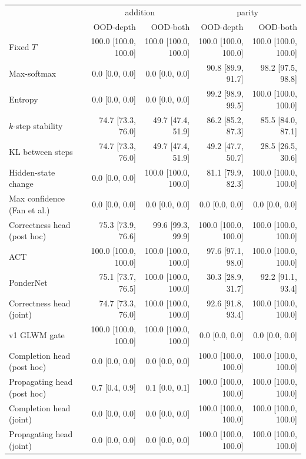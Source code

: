 \begin{tabular}{lrrrr}
\toprule
 & \multicolumn{2}{c}{addition} & \multicolumn{2}{c}{parity} \\
 & OOD-depth & OOD-both & OOD-depth & OOD-both \\
\midrule
Fixed $T$ & 100.0 \tiny{[100.0, 100.0]} & 100.0 \tiny{[100.0, 100.0]} & 100.0 \tiny{[100.0, 100.0]} & 100.0 \tiny{[100.0, 100.0]} \\
Max-softmax & 0.0 \tiny{[0.0, 0.0]} & 0.0 \tiny{[0.0, 0.0]} & 90.8 \tiny{[89.9, 91.7]} & 98.2 \tiny{[97.5, 98.8]} \\
Entropy & 0.0 \tiny{[0.0, 0.0]} & 0.0 \tiny{[0.0, 0.0]} & 99.2 \tiny{[98.9, 99.5]} & 100.0 \tiny{[100.0, 100.0]} \\
$k$-step stability & 74.7 \tiny{[73.3, 76.0]} & 49.7 \tiny{[47.4, 51.9]} & 86.2 \tiny{[85.2, 87.3]} & 85.5 \tiny{[84.0, 87.1]} \\
KL between steps & 74.7 \tiny{[73.3, 76.0]} & 49.7 \tiny{[47.4, 51.9]} & 49.2 \tiny{[47.7, 50.7]} & 28.5 \tiny{[26.5, 30.6]} \\
Hidden-state change & 0.0 \tiny{[0.0, 0.0]} & 100.0 \tiny{[100.0, 100.0]} & 81.1 \tiny{[79.9, 82.3]} & 100.0 \tiny{[100.0, 100.0]} \\
Max confidence (Fan et al.) & 0.0 \tiny{[0.0, 0.0]} & 0.0 \tiny{[0.0, 0.0]} & 0.0 \tiny{[0.0, 0.0]} & 0.0 \tiny{[0.0, 0.0]} \\
Correctness head (post hoc) & 75.3 \tiny{[73.9, 76.6]} & 99.6 \tiny{[99.3, 99.9]} & 100.0 \tiny{[100.0, 100.0]} & 100.0 \tiny{[100.0, 100.0]} \\
ACT & 100.0 \tiny{[100.0, 100.0]} & 100.0 \tiny{[100.0, 100.0]} & 97.6 \tiny{[97.1, 98.0]} & 100.0 \tiny{[100.0, 100.0]} \\
PonderNet & 75.1 \tiny{[73.7, 76.5]} & 100.0 \tiny{[100.0, 100.0]} & 30.3 \tiny{[28.9, 31.7]} & 92.2 \tiny{[91.1, 93.4]} \\
Correctness head (joint) & 74.7 \tiny{[73.3, 76.0]} & 100.0 \tiny{[100.0, 100.0]} & 92.6 \tiny{[91.8, 93.4]} & 100.0 \tiny{[100.0, 100.0]} \\
v1 GLWM gate & 100.0 \tiny{[100.0, 100.0]} & 100.0 \tiny{[100.0, 100.0]} & 0.0 \tiny{[0.0, 0.0]} & 0.0 \tiny{[0.0, 0.0]} \\
Completion head (post hoc) & 0.0 \tiny{[0.0, 0.0]} & 0.0 \tiny{[0.0, 0.0]} & 100.0 \tiny{[100.0, 100.0]} & 100.0 \tiny{[100.0, 100.0]} \\
Propagating head (post hoc) & 0.7 \tiny{[0.4, 0.9]} & 0.1 \tiny{[0.0, 0.1]} & 100.0 \tiny{[100.0, 100.0]} & 100.0 \tiny{[100.0, 100.0]} \\
Completion head (joint) & 0.0 \tiny{[0.0, 0.0]} & 0.0 \tiny{[0.0, 0.0]} & 100.0 \tiny{[100.0, 100.0]} & 100.0 \tiny{[100.0, 100.0]} \\
Propagating head (joint) & 0.0 \tiny{[0.0, 0.0]} & 0.0 \tiny{[0.0, 0.0]} & 100.0 \tiny{[100.0, 100.0]} & 100.0 \tiny{[100.0, 100.0]} \\
\bottomrule
\end{tabular}